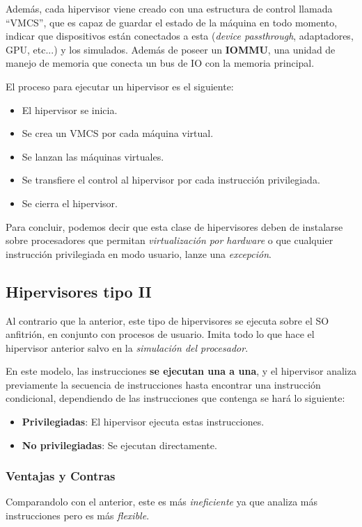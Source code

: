 \par \noindent Además, cada hipervisor viene creado con una estructura de control llamada ``VMCS'', que es capaz de guardar el estado de la máquina en todo momento, indicar que dispositivos están conectados a esta (\textit{device passthrough}, adaptadores, GPU, etc...) y los simulados. Además de poseer un \textbf{IOMMU}, una unidad de manejo de memoria que conecta un bus de IO con la memoria principal.
\par \noindent El proceso para ejecutar un hipervisor es el siguiente:
\begin{itemize}
        \item El hipervisor se inicia.
        \item Se crea un VMCS por cada máquina virtual.
        \item Se lanzan las máquinas virtuales.
        \item Se transfiere el control al hipervisor por cada instrucción privilegiada.
        \item Se cierra el hipervisor.
\end{itemize}
\noindent Para concluir, podemos decir que esta clase de hipervisores deben de instalarse sobre procesadores que permitan \textit{virtualización por hardware} o que cualquier instrucción privilegiada en modo usuario, lanze una \textit{excepción}.
\subsection{Hipervisores tipo II}
\noindent Al contrario que la anterior, este tipo de hipervisores se ejecuta sobre el SO anfitrión, en conjunto con procesos de usuario. Imita todo lo que hace el hipervisor anterior salvo en la \textit{simulación del procesador}.
\par\noindent En este modelo, las instrucciones \textbf{se ejecutan una a una}, y el hipervisor analiza previamente la secuencia de instrucciones hasta encontrar una instrucción condicional, dependiendo de las instrucciones que contenga se hará lo siguiente:
\begin{itemize}
        \item \textbf{Privilegiadas}: El hipervisor ejecuta estas instrucciones.
        \item \textbf{No privilegiadas}: Se ejecutan directamente.
\end{itemize}
\subsubsection{Ventajas y Contras}
\noindent Comparandolo con el anterior, este es más \textit{ineficiente} ya que analiza más instrucciones pero es más \textit{flexible}.
